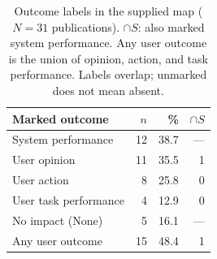 \begin{table}[t]
\centering
\begin{tabular}{lrrr}
\toprule
Marked outcome & $n$ & \% & $\cap S$ \\
\midrule
System performance & 12 & 38.7 & --- \\
User opinion & 11 & 35.5 & 1 \\
User action & 8 & 25.8 & 0 \\
User task performance & 4 & 12.9 & 0 \\
No impact (None) & 5 & 16.1 & --- \\
Any user outcome & 15 & 48.4 & 1 \\
\bottomrule
\end{tabular}
\caption{Outcome labels in the supplied map ($N=31$ publications). $\cap S$: also marked system performance. Any user outcome is the union of opinion, action, and task performance. Labels overlap; unmarked does not mean absent.}
\label{tab:outcomes}
\end{table}
